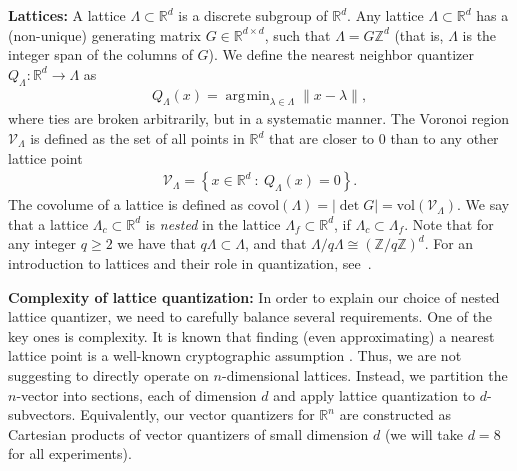 \documentclass{article}
\newcommand{\RR}{\mathbb{R}}
\newcommand{\m}{\mathcal}
\DeclareMathOperator*{\argmin}{\arg\!\min}
\newcommand{\ZZ}{\mathbb{Z}}
\theoremstyle{plain}
\theoremstyle{definition}
\theoremstyle{remark}
\begin{document}
\textbf{Lattices:} A lattice $\Lambda\subset\mathbb{R}^d$ is a discrete subgroup of $\mathbb{R}^d$. Any lattice $\Lambda\subset\mathbb{R}^d$ has a (non-unique) generating matrix $G\in \mathbb{R}^{d\times d}$, such that $\Lambda=G \mathbb{Z}^d$ (that is, $\Lambda$ is the integer span of the columns of $G$). We define the nearest neighbor quantizer $Q_\Lambda:\mathbb{R}^d\to \Lambda$ as
\begin{align}
Q_{\Lambda}(x)=\argmin_{\lambda\in \Lambda}\|x-\lambda\|, 
\label{eq:QLdef}
\end{align}
where ties are broken arbitrarily, but in a systematic manner. The Voronoi region $\m{V}_\Lambda$ is defined as the set of all points in $\RR^d$ that are closer to $0$ than to any other lattice point
\begin{align}
\m{V}_\Lambda=\left\{x\in\RR^d~:~Q_\Lambda(x)=0\right\}.    
\label{eq:Vorodef}
\end{align}
The covolume of a lattice is defined as $\mathrm{covol}(\Lambda)=|\det G|=\mathrm{vol}(\m{V}_{\Lambda})$. We say that a lattice $\Lambda_c\subset \RR^d$ is \emph{nested} in the lattice $\Lambda_f\subset\RR^d$, if $\Lambda_c\subset\Lambda_f$. Note that for any integer $q\geq 2$ we have that $q\Lambda\subset\Lambda$, and that $\Lambda/q\Lambda\cong(\ZZ/q\ZZ)^d$. 
For an introduction to lattices and their role in quantization, see~\cite{ramiBook}.


\textbf{Complexity of lattice quantization:} 
In order to explain our choice of nested lattice quantizer, we need to carefully balance several requirements. One of the key ones is complexity. It is known that finding (even approximating) a nearest lattice point is a well-known cryptographic assumption \cite{DBLP:journals/combinatorica/DinurKRS03}.
Thus, we are not suggesting to directly operate on $n$-dimensional lattices. Instead, we partition the $n$-vector into sections, each of dimension $d$ and apply lattice quantization to $d$-subvectors. Equivalently, our vector quantizers for $\RR^n$ are constructed as Cartesian products of vector quantizers of small dimension $d$ (we will take $d=8$ for all experiments).
\end{document}
